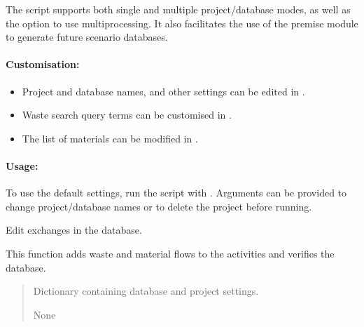\documentclass[letterpaper,10pt,english]{sphinxmanual}
\begin{document}
\sphinxAtStartPar
The script supports both single and multiple project/database modes, as well as the option to use multiprocessing. It also facilitates the use of the premise module to generate future scenario databases.


\paragraph{Customisation:}
\label{\detokenize{WasteAndMaterialFootprint:customisation}}\begin{itemize}
\item {} 
\sphinxAtStartPar
Project and database names, and other settings can be edited in .

\item {} 
\sphinxAtStartPar
Waste search query terms can be customised in .

\item {} 
\sphinxAtStartPar
The list of materials can be modified in .

\end{itemize}


\paragraph{Usage:}
\label{\detokenize{WasteAndMaterialFootprint:usage}}
\sphinxAtStartPar
To use the default settings, run the script with . 
Arguments can be provided to change project/database names or to delete the project before running.

\begin{fulllineitems}
\label{\detokenize{WasteAndMaterialFootprint:WasteAndMaterialFootprint.main.EditExchanges}}
\pysigstartsignatures
{}
\pysigstopsignatures
\sphinxAtStartPar
Edit exchanges in the database.

\sphinxAtStartPar
This function adds waste and material flows to the activities and verifies the database.
\begin{quote}\begin{description}
\sphinxAtStartPar
{} \textendash{} Dictionary containing database and project settings.

\sphinxAtStartPar
None

\end{description}\end{quote}

\end{fulllineitems}
\end{document}

